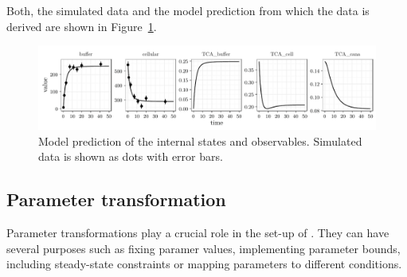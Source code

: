 \documentclass[article]{jss}
\begin{document}
\begin{CodeChunk}
\end{CodeChunk}
Both, the simulated data and the model prediction from which the data is derived are shown in Figure~\ref{fig:observation}.
\begin{figure}[ht]
	\centering
	\includegraphics[width = \textwidth]{images/figure2}
	\caption{Model prediction of the internal states and observables. Simulated data is shown as dots with error bars.}
	\label{fig:observation}
\end{figure}

\subsection{Parameter transformation}
Parameter transformations play a crucial role in the set-up of . They can have several purposes such as fixing paramer values, implementing parameter bounds, including steady-state constraints or mapping parameters to different conditions.
\end{document}
